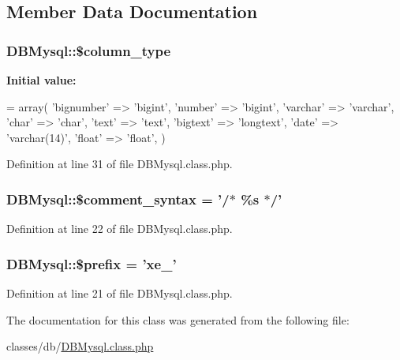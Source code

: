 \subsection{Member Data Documentation}
\hypertarget{classDBMysql_aa93c8f5f14304a16864a0708a3ba41b0}{
\subsubsection[{\$column\-\_\-type}]{\setlength{\rightskip}{0pt plus 5cm}D\-B\-Mysql\-::\$column\-\_\-type}}\label{classDBMysql_aa93c8f5f14304a16864a0708a3ba41b0}
{\bfseries Initial value\-:}
\begin{DoxyCode}
= array(
        \textcolor{stringliteral}{'bignumber'} => \textcolor{stringliteral}{'bigint'},
        \textcolor{stringliteral}{'number'} => \textcolor{stringliteral}{'bigint'},
        \textcolor{stringliteral}{'varchar'} => \textcolor{stringliteral}{'varchar'},
        \textcolor{stringliteral}{'char'} => \textcolor{stringliteral}{'char'},
        \textcolor{stringliteral}{'text'} => \textcolor{stringliteral}{'text'},
        \textcolor{stringliteral}{'bigtext'} => \textcolor{stringliteral}{'longtext'},
        \textcolor{stringliteral}{'date'} => \textcolor{stringliteral}{'varchar(14)'},
        \textcolor{stringliteral}{'float'} => \textcolor{stringliteral}{'float'},
    )
\end{DoxyCode}


Definition at line 31 of file D\-B\-Mysql.\-class.\-php.

\hypertarget{classDBMysql_a2c00f6e29c9e4fc4a532f806cf4313c2}{
\subsubsection[{\$comment\-\_\-syntax}]{\setlength{\rightskip}{0pt plus 5cm}D\-B\-Mysql\-::\$comment\-\_\-syntax = '/$\ast$ \%s $\ast$/'}}\label{classDBMysql_a2c00f6e29c9e4fc4a532f806cf4313c2}


Definition at line 22 of file D\-B\-Mysql.\-class.\-php.

\hypertarget{classDBMysql_ac95b2047c4c75730e0533be0cccd19d9}{
\subsubsection[{\$prefix}]{\setlength{\rightskip}{0pt plus 5cm}D\-B\-Mysql\-::\$prefix = 'xe\-\_\-'}}\label{classDBMysql_ac95b2047c4c75730e0533be0cccd19d9}


Definition at line 21 of file D\-B\-Mysql.\-class.\-php.



The documentation for this class was generated from the following file\-:\begin{DoxyCompactItemize}
\item 
classes/db/\hyperlink{DBMysql_8class_8php}{D\-B\-Mysql.\-class.\-php}\end{DoxyCompactItemize}
